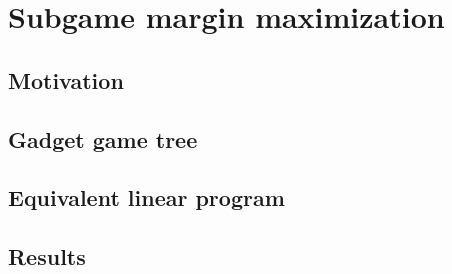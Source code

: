 \chapter{Subgame margin maximization}

\section{Motivation}

\section{Gadget game tree}

\section{Equivalent linear program}

\section{Results}
